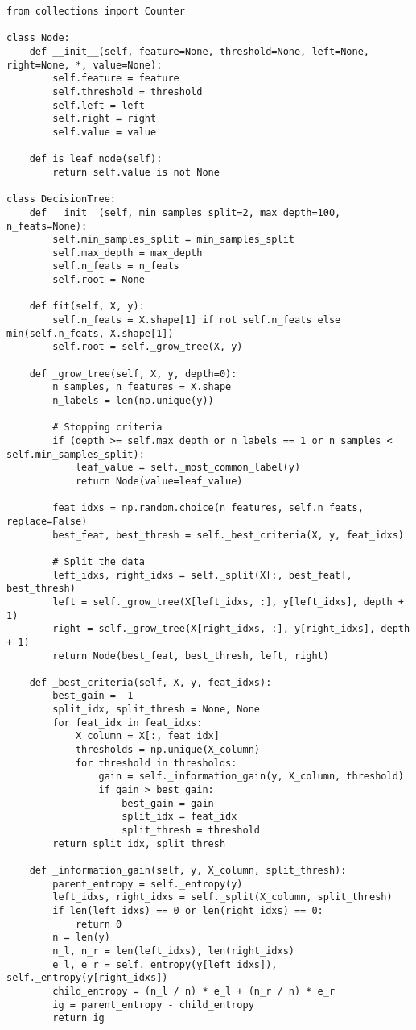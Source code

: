 \documentclass[11pt,a4paper]{article}
\begin{document}
\begin{lstlisting}
from collections import Counter

class Node:
    def __init__(self, feature=None, threshold=None, left=None, right=None, *, value=None):
        self.feature = feature
        self.threshold = threshold
        self.left = left
        self.right = right
        self.value = value

    def is_leaf_node(self):
        return self.value is not None

class DecisionTree:
    def __init__(self, min_samples_split=2, max_depth=100, n_feats=None):
        self.min_samples_split = min_samples_split
        self.max_depth = max_depth
        self.n_feats = n_feats
        self.root = None

    def fit(self, X, y):
        self.n_feats = X.shape[1] if not self.n_feats else min(self.n_feats, X.shape[1])
        self.root = self._grow_tree(X, y)

    def _grow_tree(self, X, y, depth=0):
        n_samples, n_features = X.shape
        n_labels = len(np.unique(y))

        # Stopping criteria
        if (depth >= self.max_depth or n_labels == 1 or n_samples < self.min_samples_split):
            leaf_value = self._most_common_label(y)
            return Node(value=leaf_value)

        feat_idxs = np.random.choice(n_features, self.n_feats, replace=False)
        best_feat, best_thresh = self._best_criteria(X, y, feat_idxs)
        
        # Split the data
        left_idxs, right_idxs = self._split(X[:, best_feat], best_thresh)
        left = self._grow_tree(X[left_idxs, :], y[left_idxs], depth + 1)
        right = self._grow_tree(X[right_idxs, :], y[right_idxs], depth + 1)
        return Node(best_feat, best_thresh, left, right)

    def _best_criteria(self, X, y, feat_idxs):
        best_gain = -1
        split_idx, split_thresh = None, None
        for feat_idx in feat_idxs:
            X_column = X[:, feat_idx]
            thresholds = np.unique(X_column)
            for threshold in thresholds:
                gain = self._information_gain(y, X_column, threshold)
                if gain > best_gain:
                    best_gain = gain
                    split_idx = feat_idx
                    split_thresh = threshold
        return split_idx, split_thresh

    def _information_gain(self, y, X_column, split_thresh):
        parent_entropy = self._entropy(y)
        left_idxs, right_idxs = self._split(X_column, split_thresh)
        if len(left_idxs) == 0 or len(right_idxs) == 0:
            return 0
        n = len(y)
        n_l, n_r = len(left_idxs), len(right_idxs)
        e_l, e_r = self._entropy(y[left_idxs]), self._entropy(y[right_idxs])
        child_entropy = (n_l / n) * e_l + (n_r / n) * e_r
        ig = parent_entropy - child_entropy
        return ig


\end{lstlisting}
\end{document}
